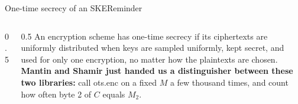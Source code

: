 \ifdefined\PRESENTATION\else\PassOptionsToClass{handout}{beamer}\fi\documentclass[aspectratio=169, lualatex]{beamer}
\begin{document}
\begin{frame}{One-time secrecy of an SKE}{Reminder}
	\begin{columns}[c]
		\begin{column}{0.5\textwidth}
		\end{column}
		\begin{column}{0.5\textwidth}
			An encryption scheme has one-time secrecy if its ciphertexts are uniformly distributed when keys are sampled uniformly, kept secret, and used for only one encryption, no matter how the plaintexts are chosen.
			\\[1em]
			\textbf{Mantin and Shamir just handed us a distinguisher between these two libraries:} call \textsf{ots.enc} on a fixed $M$ a few thousand times, and count how often byte 2 of $C$ equals $M_2$.
		\end{column}
	\end{columns}
\end{frame}
\end{document}
